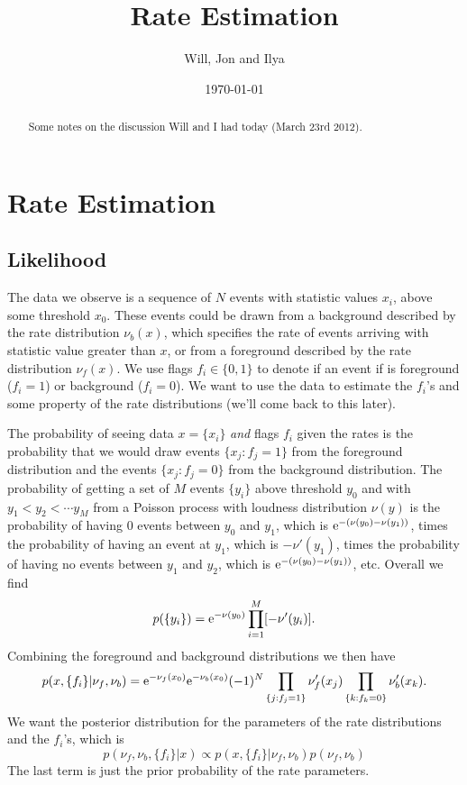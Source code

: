 \documentclass[prd,aps,eqsecnum]{revtex4}
\def\be{\begin{equation}}
\def\ee{\end{equation}}
\begin{document}
\title{Rate Estimation}
\author{Will, Jon and Ilya}

\date{\today}

\begin{abstract}
Some notes on the discussion Will and I had today (March 23rd 2012).
\end{abstract}

\maketitle

\section{Rate Estimation}
\subsection{Likelihood}
The data we observe is a sequence of $N$ events with statistic values $x_i$, above some threshold $x_0$. These events could be drawn from a background described by the rate distribution $\nu_b(x)$, which specifies the rate of events arriving with statistic value greater than $x$, or from a foreground described by the rate distribution $\nu_f(x)$. We use flags $f_i \in \{0,1\}$ to denote if an event if is foreground ($f_i=1$) or background ($f_i=0$). We want to use the data to estimate the $f_i$'s and some property of the rate distributions (we'll come back to this later).

The probability of seeing data $x = \{x_i\}$ {\it and} flags $f_i$ given the rates is the probability that we would draw events $\{x_j : f_j=1\}$ from the foreground distribution and the events $\{x_j : f_j=0\}$ from the background distribution. The probability of getting a set of $M$ events $\{y_i\}$ above threshold $y_0$ and with $y_1 < y_2 < \cdots y_M$ from a Poisson process with loudness distribution $\nu(y)$ is the probability of having $0$ events between $y_0$ and $y_1$, which is ${\rm e}^{-(\nu(y_0)-\nu(y_1))}$, times the probability of having an event at $y_1$, which is $-\nu'(y_1)$, times the probability of having no events between $y_1$ and $y_2$, which is ${\rm e}^{-(\nu(y_0)-\nu(y_1))}$, etc. Overall we find
\begin{equation}
p(\{y_i\}) = {\rm e}^{-\nu(y_0)} \prod_{i=1}^M [-\nu'(y_i)].
\end{equation}
Combining the foreground and background distributions we then have
\begin{equation}
p(x, \{f_i\} | \nu_f, \nu_b) = {\rm e}^{-\nu_f(x_0)} {\rm e}^{-\nu_b(x_0)} (-1)^N \prod_{\{j :   f_j=1\}} \nu_f'(x_j)\prod_{\{k : f_k=0\}} \nu_b'(x_k) .
\end{equation}
We want the posterior distribution for the parameters of the rate distributions and the $f_i$'s, which is
\be
p(\nu_f, \nu_b, \{f_i\} | x) \propto p(x, \{f_i\} | \nu_f, \nu_b) p(\nu_f, \nu_b)
\ee
The last term is just the prior probability of the rate parameters.
\end{document}
